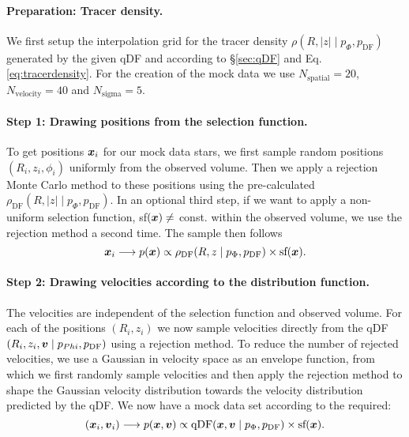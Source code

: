 \paragraph{Preparation: Tracer density.} We first setup the interpolation grid for the tracer density $\rho(R,|z| \mid p_\Phi, p_\text{DF})$ generated by the given qDF and according to \S\ref{sec:qDF} and Eq. \ref{eq:tracerdensity}. For the creation of the mock data we use $N_\text{spatial} = 20$, $N_\text{velocity} = 40$ and $N_\text{sigma}=5$.

\paragraph{Step 1: Drawing positions from the selection function.} To get positions $\boldsymbol{x}_i$ for our mock data stars, we first sample random positions $(R_i,z_i,\phi_i)$ uniformly from the observed volume. Then we apply a rejection Monte Carlo method to these positions using the pre-calculated $\rho_\text{DF}(R,|z| \mid p_{\Phi},p_\text{DF})$. In an optional third step, if we want to apply a non-uniform selection function, sf$(\boldsymbol{x}) \neq $ const. within the observed volume, we use the rejection method a second time. The sample then follows 
\begin{equation*}
\boldsymbol{x}_i \longrightarrow p(\boldsymbol{x}) \propto \rho_\text{DF}(R,z \mid p_{\Phi},p_\text{DF}) \times \text{sf}(\boldsymbol{x}).
\end{equation*}

\paragraph{Step 2: Drawing velocities according to the distribution function.} The velocities are independent of the selection function and observed volume. For each of the positions $(R_i,z_i)$ we now sample velocities directly from the qDF$(R_i,z_i,\boldsymbol{v} \mid p_{Phi},p_\text{DF})$ using a rejection method. To reduce the number of rejected velocities, we use a Gaussian in velocity space as an envelope function, from which we first randomly sample velocities and then apply the rejection method to shape the Gaussian velocity distribution towards the velocity distribution predicted by the qDF. We now have a mock data set according to the required:
\begin{equation*}
(\boldsymbol{x}_i,\boldsymbol{v}_i) \longrightarrow p(\boldsymbol{x},\boldsymbol{v}) \propto \text{qDF}(\boldsymbol{x},\boldsymbol{v} \mid p_{\Phi},p_\text{DF}) \times \text{sf}(\boldsymbol{x}).
\end{equation*} 

